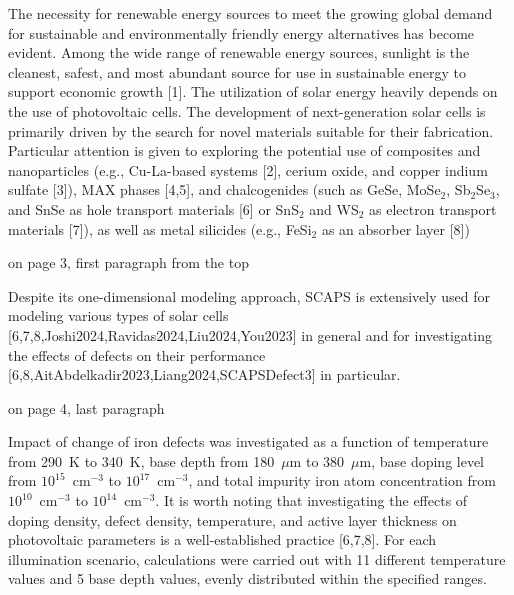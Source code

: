 \documentclass[a4paper,fleqn]{cas-sc}
\begin{document}
\begin{mdframed}
The necessity for renewable energy sources to meet the growing global demand for sustainable and environmentally friendly energy alternatives has become evident.
Among the wide range of renewable energy sources, sunlight is the cleanest, safest,
and most abundant source for use in sustainable energy to support economic growth [1].
The utilization of solar energy heavily depends on the use of photovoltaic cells.
\textcolor[rgb]{1.00,0.07,0.00}{
The development of next-generation solar cells is primarily driven by the search for novel materials suitable for their fabrication.
Particular attention is given to exploring the potential use of composites and nanoparticles
(e.g., Cu-La-based systems [2], cerium oxide, and copper indium sulfate [3]),
MAX phases [4,5],
and chalcogenides (such as GeSe, MoSe$_2$, Sb$_2$Se$_3$, and SnSe as hole transport materials [6]
or SnS$_2$ and WS$_2$ as electron transport materials [7]),
as well as metal silicides (e.g., FeSi$_2$ as an absorber layer [8])}
\end{mdframed}

on page 3, first paragraph from the top


\begin{mdframed}
Despite its one-dimensional modeling approach, SCAPS is extensively used for modeling various types
of solar cells [\textcolor[rgb]{1.00,0.07,0.00}{6,7,8},Joshi2024,Ravidas2024,Liu2024,You2023] in general
and for investigating the effects of defects on their performance [\textcolor[rgb]{1.00,0.07,0.00}{6,8,}AitAbdelkadir2023,Liang2024,SCAPSDefect3] in particular.
\end{mdframed}


on page 4, last paragraph

\begin{mdframed}
Impact of change of iron defects was investigated as a function of temperature from 290~K to 340~K,
base depth from 180~$\mu$m to 380~$\mu$m,
base doping level from $10^{15}$~cm$^{-3}$ to $10^{17}$~cm$^{-3}$,
and total impurity iron atom concentration from $10^{10}$~cm$^{-3}$ to $10^{14}$~cm$^{-3}$.
\textcolor[rgb]{1.00,0.07,0.00}{It is worth noting that investigating the effects of doping density, defect density, temperature, and active layer thickness on photovoltaic parameters is a well-established practice [6,7,8].}
For each illumination scenario, calculations were carried out with 11 different temperature values and 5 base depth values,
evenly distributed within the specified ranges.
\end{mdframed}
\end{document}
